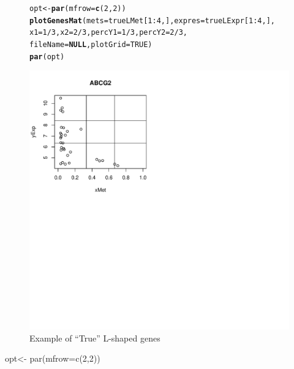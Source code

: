 \documentclass[a4paper,10pt]{article}\usepackage[]{graphicx}\usepackage[]{xcolor}
\makeatletter
\def\maxwidth{ %
  \ifdim\Gin@nat@width>\linewidth
    \linewidth
  \else
    \Gin@nat@width
  \fi
}
\newcommand{\hlnum}[1]{\textcolor[rgb]{0.686,0.059,0.569}{#1}}%
\newcommand{\hlopt}[1]{\textcolor[rgb]{0,0,0}{#1}}%
\newcommand{\hlstd}[1]{\textcolor[rgb]{0.345,0.345,0.345}{#1}}%
\newcommand{\hlkwa}[1]{\textcolor[rgb]{0.161,0.373,0.58}{\textbf{#1}}}%
\newcommand{\hlkwb}[1]{\textcolor[rgb]{0.69,0.353,0.396}{#1}}%
\newcommand{\hlkwc}[1]{\textcolor[rgb]{0.333,0.667,0.333}{#1}}%
\newcommand{\hlkwd}[1]{\textcolor[rgb]{0.737,0.353,0.396}{\textbf{#1}}}%
\newenvironment{kframe}{%
 \def\at@end@of@kframe{}%
 \ifinner\ifhmode%
  \def\at@end@of@kframe{\end{minipage}}%
  \begin{minipage}{\columnwidth}%
 \fi\fi%
 \def\FrameCommand##1{\hskip\@totalleftmargin \hskip-\fboxsep
 \colorbox{shadecolor}{##1}\hskip-\fboxsep
     \hskip-\linewidth \hskip-\@totalleftmargin \hskip\columnwidth}%
 \MakeFramed {\advance\hsize-\width
   \@totalleftmargin\z@ \linewidth\hsize
   \@setminipage}}%
 {\par\unskip\endMakeFramed%
 \at@end@of@kframe}
\newenvironment{knitrout}{}{} %
\makeatother
\begin{document}
\begin{figure}
\centering
\begin{knitrout}
\color{fgcolor}\begin{kframe}
\begin{alltt}
\hlstd{opt}\hlkwb{<-} \hlkwd{par}\hlstd{(}\hlkwc{mfrow}\hlstd{=}\hlkwd{c}\hlstd{(}\hlnum{2}\hlstd{,}\hlnum{2}\hlstd{))}
\hlkwd{plotGenesMat} \hlstd{(}\hlkwc{mets}\hlstd{=trueLMet[}\hlnum{1}\hlopt{:}\hlnum{4}\hlstd{,],} \hlkwc{expres}\hlstd{=trueLExpr[}\hlnum{1}\hlopt{:}\hlnum{4}\hlstd{,],}
              \hlkwc{x1}\hlstd{=}\hlnum{1}\hlopt{/}\hlnum{3}\hlstd{,} \hlkwc{x2}\hlstd{=}\hlnum{2}\hlopt{/}\hlnum{3}\hlstd{,} \hlkwc{percY1}\hlstd{=}\hlnum{1}\hlopt{/}\hlnum{3}\hlstd{,} \hlkwc{percY2}\hlstd{=}\hlnum{2}\hlopt{/}\hlnum{3}\hlstd{,}
              \hlkwc{fileName}\hlstd{=}\hlkwa{NULL}\hlstd{,} \hlkwc{plotGrid} \hlstd{=} \hlnum{TRUE}\hlstd{)}
\hlkwd{par}\hlstd{(opt)}
\end{alltt}
\end{kframe}
\includegraphics[width=\maxwidth]{figure/plotTRUE1-1} 
\end{knitrout}
\caption{Example of ``True'' L-shaped genes\label{Lshaped1}}
\end{figure}opt<- par(mfrow=c(2,2))
\end{document}
